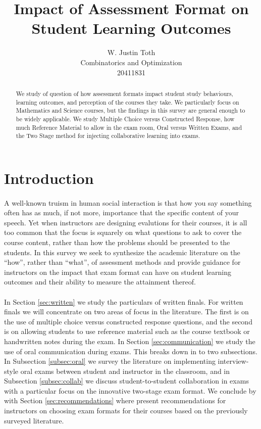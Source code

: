 \documentclass[12pt]{article}
\title{Impact of Assessment Format on Student Learning Outcomes}
\author{W. Justin Toth\\Combinatorics and Optimization\\20411831}
\begin{document}
\maketitle
\begin{abstract}
We study of question of how assessment formats impact student study behaviours, learning outcomes, and perception of the courses they take. We particularly focus on Mathematics and Science courses, but the findings in this survey are general enough to be widely applicable. We study Multiple Choice versus Constructed Response, how much Reference Material to allow in the exam room, Oral versus Written Exams, and the Two Stage method for injecting collaborative learning into exams.
\end{abstract}
\newpage
\tableofcontents
\newpage
\section{Introduction}

\paragraph{}
A well-known truism in human social interaction is that how you say something often has as much, if not more, importance that the specific content of your speech. Yet when instructors are designing evalutions for their courses, it is all too common that the focus is squarely on what questions to ask to cover the course content, rather than how the problems should be presented to the students. In this survey we seek to synthesize the academic literature on the ``how'', rather than ``what'', of assessment methods and provide guidance for instructors on the impact that exam format can have on student learning outcomes and their ability to measure the attainment thereof.
\paragraph{}
In Section \ref{sec:written} we study the particulars of written finals. For written finals we will concentrate on two areas of focus in the literature. The first is on the use of multiple choice versus constructed response questions, and the second is on allowing students to use reference material such as the course textbook or handwritten notes during the exam. In Section \ref{sec:communication} we study the use of oral communication during exams. This breaks down in to two subsections. In Subsection \ref{subsec:oral} we survey the literature on implementing interview-style oral exams  between student and instructor in the classroom, and in Subsection \ref{subsec:collab} we discuss student-to-student collaboration in exams with a particular focus on the innovative two-stage exam format. We conclude by with Section \ref{sec:recommendations} where present recommendations for instructors on choosing exam formats for their courses based on the previously surveyed literature.
\end{document}
